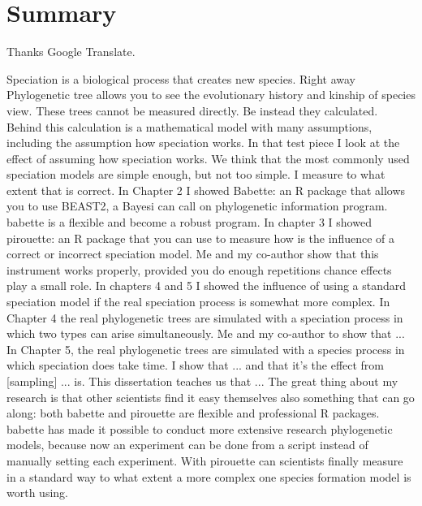 \chapter*{Summary}

Thanks Google Translate.

Speciation is a biological process that creates new species. Right away
Phylogenetic tree allows you to see the evolutionary history and kinship of species
view. These trees cannot be measured directly. Be instead
they calculated. Behind this calculation is a mathematical model with many assumptions,
including the assumption how speciation works.
In that test piece I look at the effect of assuming how speciation works.
We think that the most commonly used speciation models are simple enough,
but not too simple. I measure to what extent that is correct.
In Chapter 2 I showed Babette: an R package that allows you to use BEAST2, a Bayesi
can call on phylogenetic information program. babette is a flexible and
become a robust program.
In chapter 3 I showed pirouette: an R package that you can use to measure how
is the influence of a correct or incorrect speciation model. Me and my co-author
show that this instrument works properly, provided you do enough repetitions
chance effects play a small role.
In chapters 4 and 5 I showed the influence of using a standard
speciation model if the real speciation process is somewhat more complex. In
Chapter 4 the real phylogenetic trees are simulated with a speciation
process in which two types can arise simultaneously. Me and my co-author
to show that ...
In Chapter 5, the real phylogenetic trees are simulated with a species
process in which speciation does take time. I show that ... and that it's the effect
from [sampling] ... is.
This dissertation teaches us that ...
The great thing about my research is that other scientists find it easy themselves
also something that can go along: both babette and pirouette are flexible and professional R
packages. babette has made it possible to conduct more extensive research
phylogenetic models, because now an experiment can be done from a script
instead of manually setting each experiment. With pirouette can
scientists finally measure in a standard way to what extent a more complex one
species formation model is worth using.
